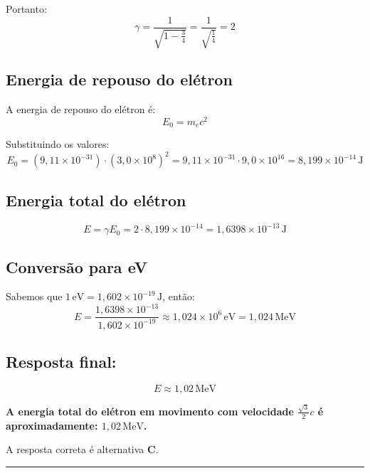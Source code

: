 \documentclass[a4paper,12pt]{article}
\begin{document}
\begin{flushleft}
Portanto:
\[
\gamma = \frac{1}{\sqrt{1 - \frac{3}{4}}} =
\frac{1}{\sqrt{\frac{1}{4}}} =
2
\]

\subsection*{Energia de repouso do elétron}

A energia de repouso do elétron é:
\[
E_0 = m_e c^2
\]

Substituindo os valores:
\[
E_0 =
\left( 9{,}11 \times 10^{-31} \right) \cdot
\left( 3{,}0 \times 10^8 \right)^2 =
9{,}11 \times 10^{-31} \cdot 9{,}0 \times 10^{16} =
8{,}199 \times 10^{-14}\, \mathrm{J}
\]

\subsection*{Energia total do elétron}

\[
E = \gamma E_0 =
2 \cdot 8{,}199 \times 10^{-14} =
1{,}6398 \times 10^{-13}\, \mathrm{J}
\]

\subsection*{Conversão para eV}

Sabemos que \(1\,\mathrm{eV} = 1{,}602 \times 10^{-19}\, \mathrm{J}\), então:
\[
E =
\frac{1{,}6398 \times 10^{-13}}{1{,}602 \times 10^{-19}} \approx
1{,}024 \times 10^6\, \mathrm{eV} =
1{,}024\,\mathrm{MeV}
\]

\subsection*{Resposta final:}

\[
\boxed{
E \approx 1{,}02\, \mathrm{MeV}
}
\]

\textbf{A energia total do elétron em movimento com velocidade \( \frac{\sqrt{3}}{2}c \) é aproximadamente: \(1{,}02\,\mathrm{MeV}\).}

A resposta correta é alternativa \colorbox{green!50}{\textbf{C}}.
\end{flushleft}

\noindent\rule{\linewidth}{0.6pt}\\
\end{document}
